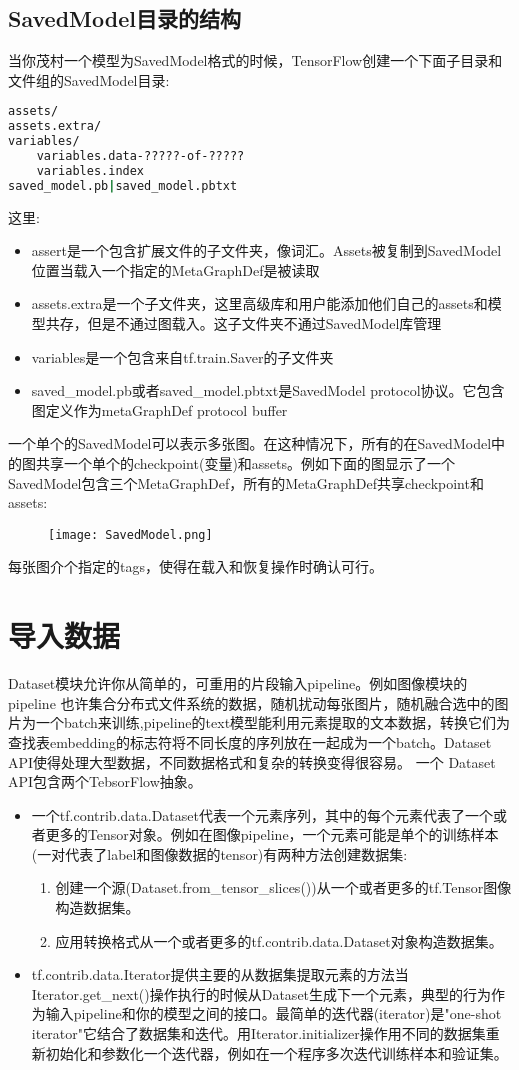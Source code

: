 \subsection{SavedModel目录的结构}
当你茂村一个模型为SavedModel格式的时候，TensorFlow创建一个下面子目录和文件组的SavedModel目录:
\begin{lstlisting}[language=Bash]
assets/
assets.extra/
variables/
    variables.data-?????-of-?????
    variables.index
saved_model.pb|saved_model.pbtxt 
\end{lstlisting}
这里:
\begin{itemize}
\item assert是一个包含扩展文件的子文件夹，像词汇。Assets被复制到SavedModel位置当载入一个指定的MetaGraphDef是被读取
\item assets.extra是一个子文件夹，这里高级库和用户能添加他们自己的assets和模型共存，但是不通过图载入。这子文件夹不通过SavedModel库管理
\item variables是一个包含来自tf.train.Saver的子文件夹
\item saved\_model.pb或者saved\_model.pbtxt是SavedModel protocol协议。它包含图定义作为metaGraphDef protocol buffer 
\end{itemize}
一个单个的SavedModel可以表示多张图。在这种情况下，所有的在SavedModel中的图共享一个单个的checkpoint(变量)和assets。例如下面的图显示了一个SavedModel包含三个MetaGraphDef，所有的MetaGraphDef共享checkpoint和assets:
\begin{figure}[H]
\centering
\texttt{[image: SavedModel.png]}
\end{figure}
每张图介个指定的tags，使得在载入和恢复操作时确认可行。

\section{导入数据}
Dataset模块允许你从简单的，可重用的片段输入pipeline。例如图像模块的pipeline
也许集合分布式文件系统的数据，随机扰动每张图片，随机融合选中的图片为一个batch来训练,pipeline的text模型能利用元素提取的文本数据，转换它们为查找表embedding的标志符将不同长度的序列放在一起成为一个batch。Dataset API使得处理大型数据，不同数据格式和复杂的转换变得很容易。
一个 Dataset
 API包含两个TebsorFlow抽象。
\begin{itemize}
\item 一个tf.contrib.data.Dataset代表一个元素序列，其中的每个元素代表了一个或者更多的Tensor对象。例如在图像pipeline，一个元素可能是单个的训练样本(一对代表了label和图像数据的tensor)有两种方法创建数据集:
	\begin{enumerate}
		\item 创建一个源(Dataset.from\_tensor\_slices())从一个或者更多的tf.Tensor图像构造数据集。
		\item 应用转换格式从一个或者更多的tf.contrib.data.Dataset对象构造数据集。
	\end{enumerate}
	\item tf.contrib.data.Iterator提供主要的从数据集提取元素的方法当Iterator.get\_next()操作执行的时候从Dataset生成下一个元素，典型的行为作为输入pipeline和你的模型之间的接口。最简单的迭代器(iterator)是"one-shot iterator"它结合了数据集和迭代。用Iterator.initializer操作用不同的数据集重新初始化和参数化一个迭代器，例如在一个程序多次迭代训练样本和验证集。
\end{itemize}
